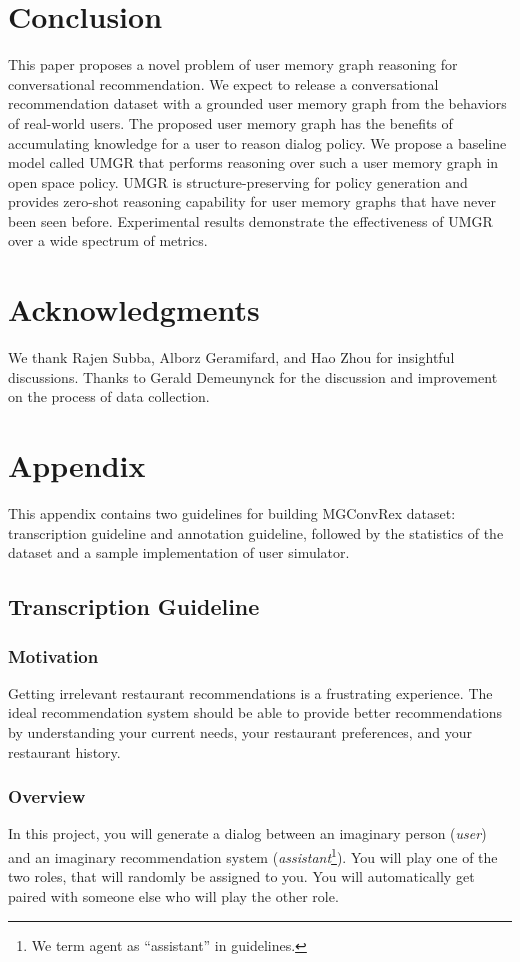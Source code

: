 \documentclass[11pt,a4paper]{article}
\begin{document}
\section{Conclusion}
This paper proposes a novel problem of user memory graph reasoning for conversational recommendation.
We expect to release a conversational recommendation dataset with a grounded user memory graph from the behaviors of real-world users.
The proposed user memory graph has the benefits of accumulating knowledge for a user to reason dialog policy.
We propose a baseline model called UMGR that performs reasoning over such a user memory graph in open space policy.
UMGR is structure-preserving for policy generation and provides zero-shot reasoning capability for user memory graphs that have never been seen before. 
Experimental results demonstrate the effectiveness of UMGR over a wide spectrum of metrics.

\section*{Acknowledgments}
We thank Rajen Subba, Alborz Geramifard, and Hao Zhou for insightful discussions. 
Thanks to Gerald Demeunynck for the discussion and improvement on the process of data collection.




\clearpage
\appendix
\section{Appendix}
This appendix contains two guidelines for building MGConvRex dataset: transcription guideline and annotation guideline, followed by the statistics of the dataset and a sample implementation of user simulator.

\subsection{Transcription Guideline}
\label{sec:transcrib}
\subsubsection{Motivation}
Getting irrelevant restaurant recommendations is a frustrating experience.
The ideal recommendation system should be able to provide better recommendations by understanding your current needs, your restaurant preferences, and your restaurant history.

\subsubsection{Overview}
In this project, you will generate a dialog between an imaginary person (\textit{user}) and an imaginary recommendation system (\textit{assistant}\footnote{We term agent as ``assistant'' in guidelines.}).  You will play one of the two roles, that will randomly be assigned to you. You will automatically get paired with someone else who will play the other role.
\end{document}

